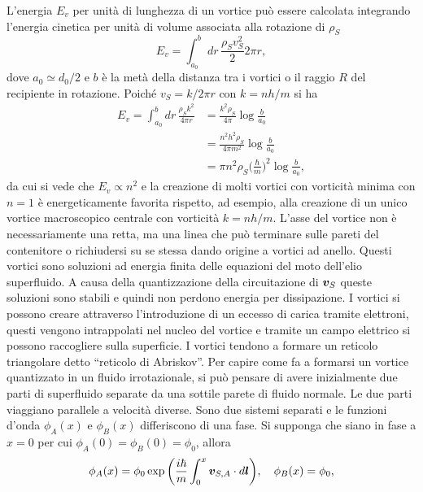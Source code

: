 L'energia $E_v$ per unità di lunghezza di un vortice può essere calcolata integrando l'energia cinetica per unità di volume associata alla rotazione di $\rho_S$ 
\begin{equation}
    E_v = \int_{a_0}^b dr\,\frac{\rho_S v_S^2}{2}2\pi r,
\end{equation}
dove $a_0 \simeq d_0/2$ e $b$ è la metà della distanza tra i vortici o il raggio $R$ del recipiente in rotazione. Poiché $v_S = k/2\pi r$ con $k = nh/m$ si ha
\begin{equation}
    \begin{split}
        E_v = \int_{a_0}^b dr\,\frac{\rho_S k^2}{4\pi r} &= \frac{k^2\rho_S}{4\pi}\log{\frac{b}{a_0}} \\
        &= \frac{n^2h^2\rho_S}{4\pi m^2}\log{\frac{b}{a_0}} \\
        &= \pi n^2\rho_S\bigg(\frac{\hbar}{m}\bigg)^2\log{\frac{b}{a_0}},
    \end{split}
\end{equation}
da cui si vede che $E_v \propto n^2$ e la creazione di molti vortici con vorticità minima con $n = 1$ è energeticamente favorita rispetto, ad esempio, alla creazione di un unico vortice macroscopico centrale con vorticità $k = nh/m$. L'asse del vortice non è necessariamente una retta, ma una linea che può terminare sulle pareti del contenitore o richiudersi su se stessa dando origine a vortici ad anello. Questi vortici sono soluzioni ad energia finita delle equazioni del moto dell'elio superfluido. A causa della quantizzazione della circuitazione di $\bm{v}_S$ queste soluzioni sono stabili e quindi non perdono energia per dissipazione. I vortici si possono creare attraverso l'introduzione di un eccesso di carica tramite elettroni, questi vengono intrappolati nel nucleo del vortice e tramite un campo elettrico si possono raccogliere sulla superficie. I vortici tendono a formare un reticolo triangolare detto ``reticolo di Abriskov''. Per capire come fa a formarsi un vortice quantizzato in un fluido irrotazionale, si può pensare di avere inizialmente due parti di superfluido separate da una sottile parete di fluido normale. Le due parti viaggiano parallele a velocità diverse. Sono due sistemi separati e le funzioni d'onda $\phi_A(x)$ e $\phi_B(x)$ differiscono di una fase. Si supponga che siano in fase a $x = 0$ per cui $\phi_A(0) = \phi_B(0) = \phi_0$, allora
\begin{equation}
    \phi_A(x) = \phi_0\exp{\bigg(\frac{i\hbar}{m}\int_0^x \bm{v}_{S,A}\cdot d\bm{l}\bigg)},\quad \phi_B(x) = \phi_0,
\end{equation}
